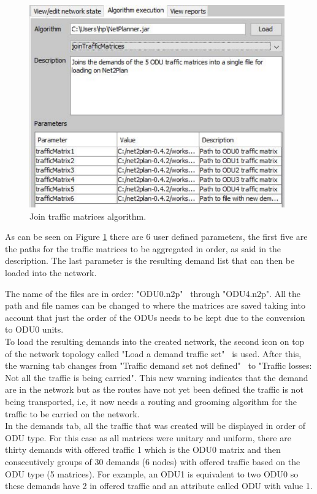 	\begin{figure}[h!]
		\centering
		\includegraphics[width=11cm]{Net2Plan_joinMatrices.pdf}
		\caption{Join traffic matrices algorithm.}
		\label{joinMatrices}		
	\end{figure}
	
	As can be seen on Figure \ref{joinMatrices} there are 6 user defined parameters, the first five are the paths for the traffic matrices to be aggregated in order, as said in the description. The last parameter is the resulting demand list that can then be loaded into the network.
	
The name of the files are in order: "ODU0.n2p" \ through "ODU4.n2p". All the path and file names can be changed to where the matrices are saved taking into account that just the order of the ODUs needs to be kept due to the conversion to ODU0 units.\\
	
	To load the resulting demands into the created network, the second icon on top of the network topology called "Load a demand traffic set" \ is used. After this, the warning tab changes from "Traffic demand set not defined" \ to "Traffic losses: Not all the traffic is being carried". This new warning indicates that the demand are in the network but as the routes have not yet been defined the traffic is not being transported, i.e, it now needs a routing and grooming algorithm for the traffic to be carried on the network.\\
	
	In the demands tab, all the traffic that was created will be displayed in order of ODU type. For this case as all matrices were unitary and uniform, there are thirty demands with offered traffic 1 which is the ODU0 matrix and then consecutively groups of 30 demands (6 nodes) with offered traffic based on the ODU type (5 matrices). For example, an ODU1 is equivalent to two ODU0 so these demands have 2 in offered traffic and an attribute called ODU with value 1.\\
		
